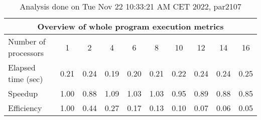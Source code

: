 \begin{table}[h]
\begin{center}
\begin{tabular}{|l|c|c|c|c|c|c|c|c|c|}
\hline
\multicolumn{10}{|c|}{Overview of whole program execution metrics} \\
\hline
\hline
Number of processors & 1 & 2 & 4 & 6 & 8 & 10 & 12 & 14 & 16 \\
\hline
Elapsed time (sec)      &       0.21 &       0.24 &       0.19 &       0.20 &       0.21 &       0.22 &       0.24 &       0.24 &       0.25 \\
\hline
Speedup                 &       1.00 &       0.88 &       1.09 &       1.03 &       1.03 &       0.95 &       0.89 &       0.88 &       0.85 \\
\hline
Efficiency              &       1.00 &       0.44 &       0.27 &       0.17 &       0.13 &       0.10 &       0.07 &       0.06 &       0.05 \\
\hline
\end{tabular}
\end{center}
\caption{ Analysis done on Tue Nov 22 10:33:21 AM CET 2022, par2107}
\end{table}

